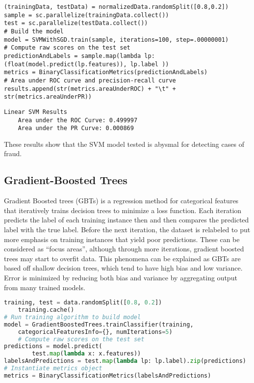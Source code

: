 \documentclass[9pt,twocolumn,twoside]{idsi}
\begin{document}
\begin{lstlisting}
(trainingData, testData) = normalizedData.randomSplit([0.8,0.2])
sample = sc.parallelize(trainingData.collect())
test = sc.parallelize(testData.collect())
# Build the model
model = SVMWithSGD.train(sample, iterations=100, step=.00000001)
# Compute raw scores on the test set
predictionAndLabels = sample.map(lambda lp: (float(model.predict(lp.features)), lp.label ))
metrics = BinaryClassificationMetrics(predictionAndLabels)
# Area under ROC curve and precision-recall curve
results.append(str(metrics.areaUnderROC) + "\t" + str(metrics.areaUnderPR))
\end{lstlisting}

\begin{lstlisting}
Linear SVM Results
	Area under the ROC Curve: 0.499997
	Area under the PR Curve: 0.000869
\end{lstlisting}

These results show that the SVM model tested is abysmal for detecting cases of fraud.

\subsection{Gradient-Boosted Trees}
Gradient Boosted trees (GBTs) is a regression method for categorical features that iteratively trains decision trees to minimize a loss function. Each iteration predicts the label of each training instance then and then compares the predicted label with the true label. Before the next iteration, the dataset is relabeled to put more emphasis on training instances that yield poor predictions. These can be considered as “focus areas”, although through more iterations, gradient boosted trees may start to overfit data. This phenomena can be explained as GBTs are based off shallow decision trees, which tend to have high bias and low variance. Error is minimized by reducing both bias and variance by aggregating output from many trained models.

\begin{lstlisting}[language=python]
training, test = data.randomSplit([0.8, 0.2])
    training.cache()
# Run training algorithm to build model
model = GradientBoostedTrees.trainClassifier(training,
    categoricalFeaturesInfo={}, numIterations=5)
    # Compute raw scores on the test set
predictions = model.predict(
    	test.map(lambda x: x.features))
labelsAndPredictions = test.map(lambda lp: lp.label).zip(predictions)    
# Instantiate metrics object
metrics = BinaryClassificationMetrics(labelsAndPredictions)
\end{lstlisting}
\end{document}
